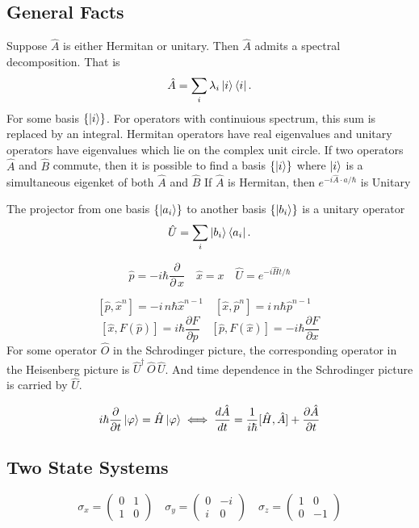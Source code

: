 \documentclass{article}
\begin{document}
  \twocolumn
    \subsection*{General Facts}
      Suppose $\hat{A}$ is either Hermitan or unitary. Then  $\hat{A}$ admits a 
      spectral decomposition. That is 
      \[
         \hat{A} = \sum_i \lambda_i \ket{i}\bra{i}
      .\] 
      For some basis $\{\ket{i} \}$. For operators with continuious spectrum,
      this sum is replaced by an integral. 
      Hermitan operators have real eigenvalues and unitary operators 
      have eigenvalues which lie on the complex unit circle.
      If two operators $\hat{A}$ and  $\hat{B}$ commute, then it is possible 
      to find a basis  $\{\ket{i}\}$ where $ \ket{i}$ is a simultaneous eigenket
      of both $\hat{A}$ and  $\hat{B}$
      If $\hat{A}$ is Hermitan, then  $e^{-i \hat{A} \cdot a / \hbar}$
      is Unitary

      The projector from one basis $ \{\ket{a_i}\}$ to another basis 
      $\{\ket{b_i}\}$ is a unitary operator \[
        \hat{U} = \sum_i \ket{b_i}\bra{a_i}
      .\] 
        
    \[
      \hat{p} = - i \hbar \frac{\partial}{\partial\,x} \quad
      \hat{x} = x \quad
      \hat{U} = e^{-i \hat{H} t / \hbar}
    \]
    
    \[
      [\hat{p},\hat{x}^n] = -i \,n \hbar \hat{x}^{n-1} \quad
      [\hat{x},\hat{p}^n] = i\,n  \hbar \hat{p}^{n-1} \quad
    \]
    \[
      [\hat{x},F(\hat{p})] = i \hbar \frac{\partial F}{\partial p} \quad
      [\hat{p},F(\hat{x})] =-i \hbar \frac{\partial F}{\partial x}
    \] 
    For some operator \(\hat{O}\) in the Schrodinger picture,
    the corresponding operator in the Heisenberg picture is 
    \(\hat{U}^\dagger\, \hat{O} \, \hat{U}\). And time dependence 
    in the Schrodinger picture is carried by \(\hat{U}\).
    

    \[
      i \hbar \frac{\partial}{\partial t} \ket{\varphi} = \hat{H} \ket{\varphi} 
      \iff \frac{d \hat{A}}{dt} = \frac{1}{i \hbar}[\hat{H},\hat{A}] + 
      \frac{\partial \hat{A}}{\partial t} 
    \]

    \subsection*{Two State Systems}
      \[
      \sigma_x = \begin{pmatrix} 0 & 1 \\ 1 & 0 \end{pmatrix} \quad
      \sigma_y = \begin{pmatrix} 0 & -i \\ i & 0 \end{pmatrix} \quad
      \sigma_z = \begin{pmatrix} 1 & 0 \\ 0 & -1 \end{pmatrix}
    \]
\end{document}
